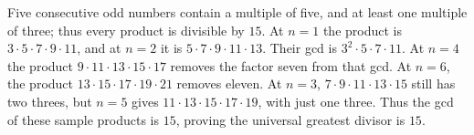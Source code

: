 Five consecutive odd numbers contain a multiple of five, and at least one multiple of three; thus every product is divisible by $15$. At $n=1$ the product is $3\cdot5\cdot7\cdot9\cdot11$, and at $n=2$ it is $5\cdot7\cdot9\cdot11\cdot13$. Their gcd is $3^2\cdot5\cdot7\cdot11$. At $n=4$ the product $9\cdot11\cdot13\cdot15\cdot17$ removes the factor seven from that gcd. At $n=6$, the product $13\cdot15\cdot17\cdot19\cdot21$ removes eleven. At $n=3$, $7\cdot9\cdot11\cdot13\cdot15$ still has two threes, but $n=5$ gives $11\cdot13\cdot15\cdot17\cdot19$, with just one three. Thus the gcd of these sample products is $15$, proving the universal greatest divisor is $\boxed{15}$.
